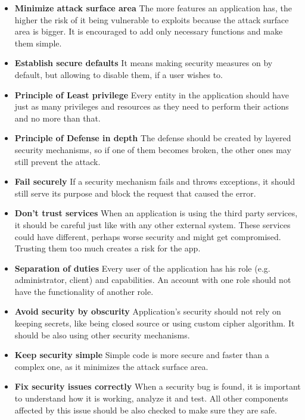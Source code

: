\documentclass[a4paper]{article}
\begin{document}
\begin{itemize}
	\item \textbf{Minimize attack surface area}
		The more features an application has, the higher the risk of it
		being vulnerable to exploits because the attack surface area is
		bigger. It is encouraged to add only necessary functions and
		make them simple.
	\item \textbf{Establish secure defaults}
		It means making security measures on by default, but allowing to
		disable them, if a user wishes to.
	\item \textbf{Principle of Least privilege}
		Every entity in the application should have just as many
		privileges and resources as they need to perform their actions
		and no more than that.
	\item \textbf{Principle of Defense in depth}
		The defense should be created by layered security mechanisms, so
		if one of them becomes broken, the other ones may still prevent
		the attack.
	\item \textbf{Fail securely}
		If a security mechanism fails and throws exceptions, it should
		still serve its purpose and block the request that caused the
		error.
	\item \textbf{Don't trust services}
		When an application is using the third party services, it
		should be careful just like with any other external system.
		These services could have different, perhaps worse security and
		might get compromised. Trusting them too much creates a risk
		for the app.
	\item \textbf{Separation of duties}
		Every user of the application has his role (e.g. administrator,
		client) and capabilities. An account with one role should not
		have the functionality of another role.
	\item \textbf{Avoid security by obscurity}
		Application's security should not rely on keeping secrets, like
		being closed source or using custom cipher algorithm. It should
		be also using other security mechanisms.
	\item \textbf{Keep security simple}
		Simple code is more secure and faster than a complex one, as it
		minimizes the attack surface area.
	\item \textbf{Fix security issues correctly}
		When a security bug is found, it is important to understand how
		it is working, analyze it and test. All other components
		affected by this issue should be also checked to make sure they
		are safe.
\end{itemize}
\end{document}
